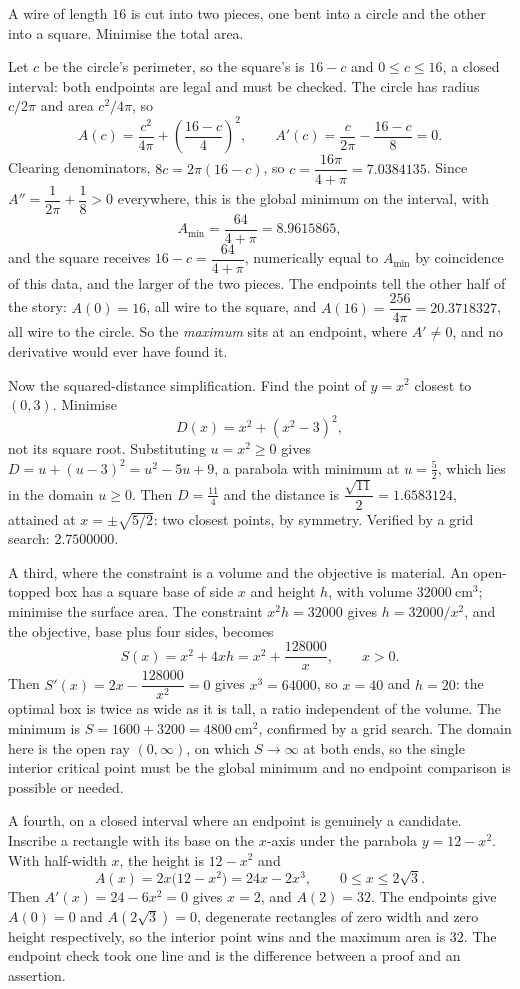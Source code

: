 \begin{worked}
A wire of length $16$ is cut into two pieces, one bent into a circle and the other into a square. Minimise the total area.

Let $c$ be the circle's perimeter, so the square's is $16-c$ and $0\leq c\leq16$, a closed interval: both endpoints are legal and must be checked. The circle has radius $c/2\pi$ and area $c^{2}/4\pi$, so
\[
A(c)=\frac{c^{2}}{4\pi}+\left(\frac{16-c}{4}\right)^{2},\qquad
A'(c)=\frac{c}{2\pi}-\frac{16-c}{8}=0 .
\]
Clearing denominators, $8c=2\pi(16-c)$, so $c=\dfrac{16\pi}{4+\pi}=7.0384135$. Since $A''=\dfrac{1}{2\pi}+\dfrac18>0$ everywhere, this is the global minimum on the interval, with
\[
A_{\min}=\frac{64}{4+\pi}=8.9615865 ,
\]
and the square receives $16-c=\dfrac{64}{4+\pi}$, numerically equal to $A_{\min}$ by coincidence of this data, and the larger of the two pieces. The endpoints tell the other half of the story: $A(0)=16$, all wire to the square, and $A(16)=\dfrac{256}{4\pi}=20.3718327$, all wire to the circle. So the \emph{maximum} sits at an endpoint, where $A'\neq0$, and no derivative would ever have found it.

Now the squared-distance simplification. Find the point of $y=x^{2}$ closest to $(0,3)$. Minimise
\[
D(x)=x^{2}+(x^{2}-3)^{2},
\]
not its square root. Substituting $u=x^{2}\geq0$ gives $D=u+(u-3)^{2}=u^{2}-5u+9$, a parabola with minimum at $u=\tfrac52$, which lies in the domain $u\geq0$. Then $D=\tfrac{11}{4}$ and the distance is $\dfrac{\sqrt{11}}{2}=1.6583124$, attained at $x=\pm\sqrt{5/2}$: two closest points, by symmetry. Verified by a grid search: $2.7500000$.

A third, where the constraint is a volume and the objective is material. An open-topped box has a square base of side $x$ and height $h$, with volume $32000\ \mathrm{cm^{3}}$; minimise the surface area. The constraint $x^{2}h=32000$ gives $h=32000/x^{2}$, and the objective, base plus four sides, becomes
\[
S(x)=x^{2}+4xh=x^{2}+\frac{128000}{x},\qquad x>0 .
\]
Then $S'(x)=2x-\dfrac{128000}{x^{2}}=0$ gives $x^{3}=64000$, so $x=40$ and $h=20$: the optimal box is twice as wide as it is tall, a ratio independent of the volume. The minimum is $S=1600+3200=4800\ \mathrm{cm^{2}}$, confirmed by a grid search. The domain here is the open ray $(0,\infty)$, on which $S\to\infty$ at both ends, so the single interior critical point must be the global minimum and no endpoint comparison is possible or needed.

A fourth, on a closed interval where an endpoint is genuinely a candidate. Inscribe a rectangle with its base on the $x$-axis under the parabola $y=12-x^{2}$. With half-width $x$, the height is $12-x^{2}$ and
\[
A(x)=2x\bigl(12-x^{2}\bigr)=24x-2x^{3},\qquad 0\leq x\leq2\sqrt3 .
\]
Then $A'(x)=24-6x^{2}=0$ gives $x=2$, and $A(2)=32$. The endpoints give $A(0)=0$ and $A(2\sqrt3)=0$, degenerate rectangles of zero width and zero height respectively, so the interior point wins and the maximum area is $32$. The endpoint check took one line and is the difference between a proof and an assertion.


\end{worked}
